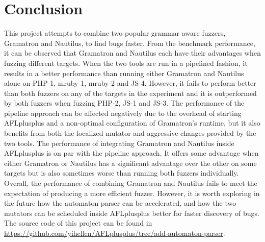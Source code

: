 \section{Conclusion}
\label{sec:conclusion}
This project attempts to combine two popular grammar aware fuzzers, Gramatron and Nautilus, to find bugs faster. From the benchmark performance, it can be observed that Gramatron and Nautilus each have their advantages when fuzzing different targets. When the two tools are run in a pipelined fashion, it results in a better performance than running either Gramatron and Nautilus alone on PHP-1, mruby-1, mruby-2 and JS-4. However, it fails to perform better than both fuzzers on any of the targets in the experiment and it is outperformed by both fuzzers when fuzzing PHP-2, JS-1 and JS-3. The performance of the pipeline approach can be affected negatively due to the overhead of starting AFLplusplus and a non-optimal configuration of Gramatron's runtime, but it also benefits from both the localized mutator and aggressive changes provided by the two tools. The performance of integrating Gramatron and Nautilus inside AFLplusplus is on par with the pipeline approach. It offers some advantage when either Gramatron or Nautilus has a significant advantage over the other on some targets but is also sometimes worse than running both fuzzers individually. Overall, the performance of combining Gramatron and Nautilus fails to meet the expectation of producing a more efficient fuzzer. However, it is worth exploring in the future how the automaton parser can be accelerated, and how the two mutators can be scheduled inside AFLplusplus better for faster discovery of bugs. The source code of this project can be found in \url{https://github.com/yihellen/AFLplusplus/tree/add-automaton-parser}.






